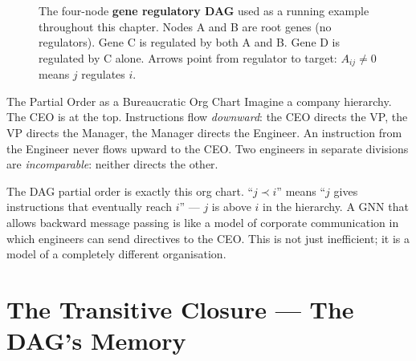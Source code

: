 \begin{figure}[H]
\centering
{}
\caption{The four-node \textbf{gene regulatory DAG} used as a running example
throughout this chapter. Nodes A and B are root genes (no regulators). Gene C
is regulated by both A and B. Gene D is regulated by C alone. Arrows point
from regulator to target: $A_{ij} \neq 0$ means $j$ regulates $i$.}
\label{fig:gene_dag}
\end{figure}

\begin{analogybox}{The Partial Order as a Bureaucratic Org Chart}
Imagine a company hierarchy. The CEO is at the top. Instructions flow
\emph{downward}: the CEO directs the VP, the VP directs the Manager, the
Manager directs the Engineer. An instruction from the Engineer never flows
upward to the CEO. Two engineers in separate divisions are \emph{incomparable}:
neither directs the other.

The DAG partial order is exactly this org chart. ``$j \prec i$'' means ``$j$
gives instructions that eventually reach $i$'' --- $j$ is above $i$ in the
hierarchy. A GNN that allows backward message passing is like a model of
corporate communication in which engineers can send directives to the CEO.
This is not just inefficient; it is a model of a completely different
organisation.
\end{analogybox}

\section{The Transitive Closure --- The DAG's Memory}
\label{sec:dagcn_transitive_closure}

